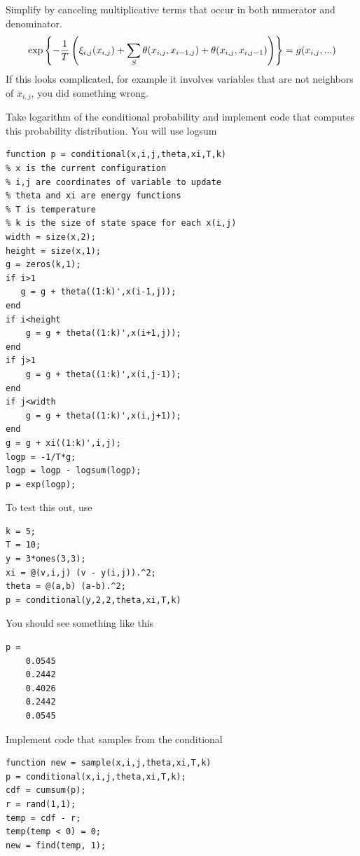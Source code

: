 \documentclass{article}
\begin{document}
Simplify by canceling multiplicative terms that occur in both numerator and denominator.
\[
\mathop{\rm exp}\left\{-\frac{1}{T}\left(\xi_{i,j}(x_{i,j}) + \sum_{S} \theta(x_{i,j},x_{i-1,j}) + \theta(x_{i,j},x_{i,j-1})\right)\right\} = g(x_{i,j},...) 
\]
If this looks complicated, for example it involves variables that are not neighbors of $x_{i,j}$, you did something wrong.	

\newproblem{2pt}
Take logarithm of the conditional probability and implement code that computes this probability distribution.
You will use logsum
\begin{verbatim}
function p = conditional(x,i,j,theta,xi,T,k)
% x is the current configuration
% i,j are coordinates of variable to update
% theta and xi are energy functions
% T is temperature
% k is the size of state space for each x(i,j)
width = size(x,2);
height = size(x,1);
g = zeros(k,1);
if i>1
   g = g + theta((1:k)',x(i-1,j));
end
if i<height
    g = g + theta((1:k)',x(i+1,j));
end
if j>1
    g = g + theta((1:k)',x(i,j-1));
end
if j<width
    g = g + theta((1:k)',x(i,j+1));
end
g = g + xi((1:k)',i,j);
logp = -1/T*g;
logp = logp - logsum(logp);
p = exp(logp);
\end{verbatim}
To test this out, use
\begin{verbatim}
k = 5;
T = 10;
y = 3*ones(3,3);
xi = @(v,i,j) (v - y(i,j)).^2;
theta = @(a,b) (a-b).^2;
p = conditional(y,2,2,theta,xi,T,k)
\end{verbatim}
You should see something like this
\begin{verbatim}
p =
    0.0545
    0.2442
    0.4026
    0.2442
    0.0545
\end{verbatim}
Implement code that samples from the conditional
\begin{verbatim}
function new = sample(x,i,j,theta,xi,T,k)
p = conditional(x,i,j,theta,xi,T,k);
cdf = cumsum(p);
r = rand(1,1);
temp = cdf - r;
temp(temp < 0) = 0;
new = find(temp, 1);
\end{verbatim}
\end{document}
